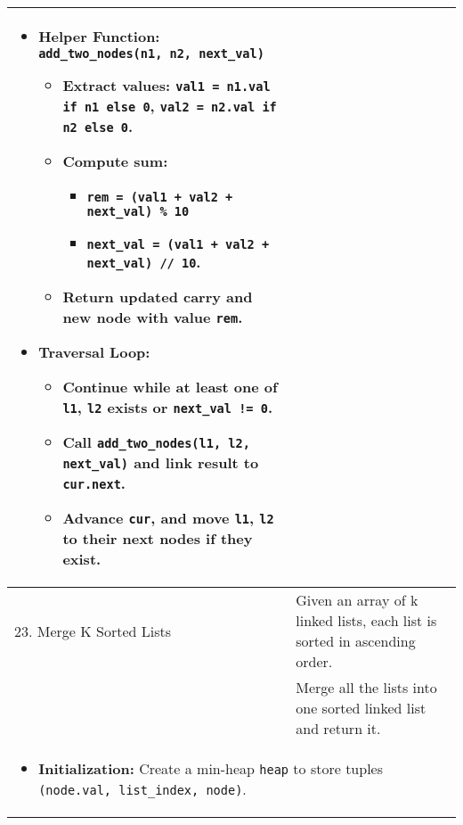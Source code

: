 \begin{summary}
\begin{center}
\begin{tabular}{ll}
{\begin{itemize}
                        \item \textbf{Helper Function:} \texttt{add\_two\_nodes(n1, n2, next\_val)}
                        \begin{itemize}
                            \item Extract values: \texttt{val1 = n1.val if n1 else 0}, \texttt{val2 = n2.val if n2 else 0}.
                            \item Compute sum:
                            \begin{itemize}
                                \item \texttt{rem = (val1 + val2 + next\_val) \% 10}
                                \item \texttt{next\_val = (val1 + val2 + next\_val) // 10}.
                            \end{itemize}
                            \item Return updated carry and new node with value \texttt{rem}.
                        \end{itemize}
                        \item \textbf{Traversal Loop:}
                        \begin{itemize}
                            \item Continue while at least one of \texttt{l1}, \texttt{l2} exists or \texttt{next\_val != 0}.
                            \item Call \texttt{add\_two\_nodes(l1, l2, next\_val)} and link result to \texttt{cur.next}.
                            \item Advance \texttt{cur}, and move \texttt{l1}, \texttt{l2} to their next nodes if they exist.
                        \end{itemize}
                    \end{itemize}                    
                } \\
                \midrule
                23. Merge K Sorted Lists & Given an array of k linked lists, each list is sorted in ascending order. \\
                & Merge all the lists into one sorted linked list and return it. \\
                \multicolumn{2}{p{\linewidth}}{
                    \begin{itemize}
                        \item \textbf{Initialization:} Create a min-heap \texttt{heap} to store tuples \texttt{(node.val, list\_index, node)}.

\end{itemize}}
\end{tabular}
\end{center}
\end{summary}
